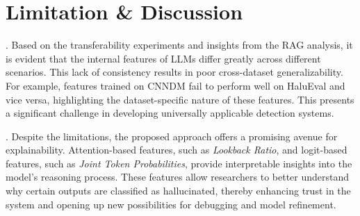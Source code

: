 \vspace{-10pt}
\section{Limitation \& Discussion}\label{sec:discussion}


.
Based on the transferability experiments and insights from the RAG analysis, it is evident that the internal features of LLMs differ greatly across different scenarios. This lack of consistency results in poor cross-dataset generalizability. For example, features trained on CNNDM fail to perform well on HaluEval and vice versa, highlighting the dataset-specific nature of these features. This presents a significant challenge in developing universally applicable detection systems.

.
Despite the limitations, the proposed approach offers a promising avenue for explainability. Attention-based features, such as \textit{Lookback Ratio}, and logit-based features, such as \textit{Joint Token Probabilities}, provide interpretable insights into the model's reasoning process. These features allow researchers to better understand why certain outputs are classified as hallucinated, thereby enhancing trust in the system and opening up new possibilities for debugging and model refinement.